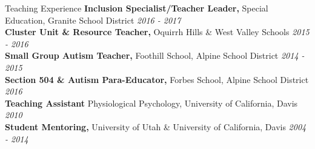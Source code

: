 \documentclass{resume} %
\begin{document}
\begin{rSection}{Teaching Experience}
	{\bf Inclusion Specialist/Teacher Leader,} Special Education, Granite School District \hfill {\em 2016 - 2017}
	\\{\bf Cluster Unit \& Resource Teacher,} Oquirrh Hills \& West Valley Schools \hfill {\em	2015 - 2016}
	\\{\bf Small Group Autism Teacher,} Foothill School, Alpine School District \hfill {\em 2014 - 2015}
	\\{\bf Section 504 \& Autism Para-Educator,} Forbes School, Alpine School District \hfill {\em 2016}
	\\{\bf Teaching Assistant} Physiological Psychology, University of California, Davis \hfill {\em 2010}
	\\{\bf Student Mentoring,} University of Utah \& University of California, Davis \hfill {\em 2004 - 2014}
\end{rSection}
\end{document}
